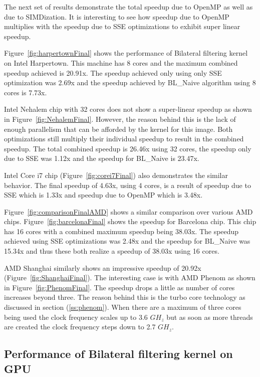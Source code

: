 \documentclass{IEEEtran}
\begin{document}
The next set of results demonstrate the total speedup due to OpenMP as well as due to SIMDization. It is interesting to see how speedup due to OpenMP multiplies with the speedup due to SSE optimizations to exhibit super linear speedup.

Figure~\ref{fig:harpertownFinal} shows the performance of Bilateral filtering kernel on Intel Harpertown. This machine has 8 cores and the maximum combined speedup achieved is 20.91x. The speedup achieved only using only SSE optimization was 2.69x and the speedup achieved by BL\_Naive algorithm using 8 cores is 7.73x.

Intel Nehalem chip with 32 cores does not show a super-linear speedup as shown in Figure~\ref{fig:NehalemFinal}. However, the reason behind this is the lack of enough parallelism that can be afforded by the kernel for this image. Both optimizations still multiply their individual speedup to result in the combined speedup. The total combined speedup is 26.46x using 32 cores, the speedup only due to SSE was 1.12x and the speedup for BL\_Naive is 23.47x.

Intel Core i7 chip (Figure~\ref{fig:corei7Final}) also demonstrates the similar behavior. The final speedup of 4.63x, using 4 cores, is a result of speedup due to SSE which is 1.33x and speedup due to OpenMP which is 3.48x. 

Figure~\ref{fig:comparisonFinalAMD} shows a similar comparison over various AMD chips. Figure~\ref{fig:barcelonaFinal} shows the speedup for Barcelona chip. This chip has 16 cores with a combined maximum speedup being 38.03x. The speedup achieved using SSE optimizations was 2.48x and the speedup for BL\_Naive was 15.34x and thus these both realize a speedup of 38.03x using 16 cores.

AMD Shanghai similarly shows an impressive speedup of 20.92x (Figure~\ref{fig:ShanghaiFinal}). The interesting case is with AMD Phenom as shown in Figure~\ref{fig:PhenomFinal}. The speedup drops a little as number of cores increases beyond three. The reason behind this is the turbo core technology as discussed in section (\ref{ss:phenom}). When there are a maximum of three cores being used the clock frequency scales up to 3.6 $GH_z$ but as soon as more threads are created the clock frequency steps down to 2.7 $GH_z$. 

\subsection{Performance of Bilateral filtering kernel on GPU}
\end{document}
